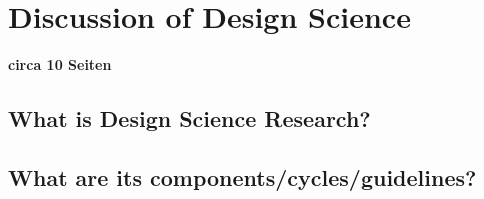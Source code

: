 \chapter{Discussion of Design Science}
\textbf{circa 10 Seiten}

\section{What is Design Science Research?} 

\section{What are its components/cycles/guidelines?}
